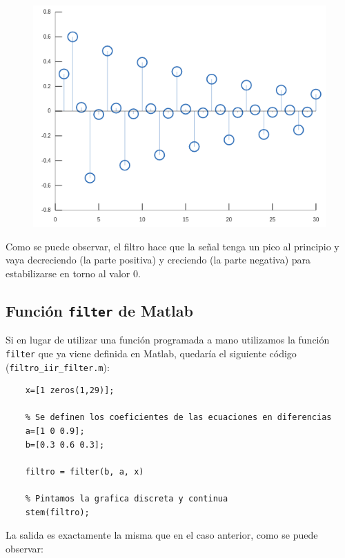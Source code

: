 \documentclass[11pt,a4paper]{article}
\begin{document}
\begin{figure}[H]
	\centering
	\includegraphics[scale=0.5]{img/stem1.png}
\end{figure}

Como se puede observar, el filtro hace que la señal tenga un pico al principio y vaya decreciendo (la parte positiva) y creciendo (la parte negativa) para estabilizarse en torno al valor 0.

\subsection{Función \texttt{filter} de Matlab}

Si en lugar de utilizar una función programada a mano utilizamos la función \texttt{filter} que ya viene definida en Matlab, quedaría el siguiente código (\texttt{filtro\_iir\_filter.m}):

\begin{lstlisting}[frame=single]
	% Se define el array con los pulsos
   	x=[1 zeros(1,29)];
   	
   	% Se definen los coeficientes de las ecuaciones en diferencias
	a=[1 0 0.9];
	b=[0.3 0.6 0.3];
	
	filtro = filter(b, a, x)
	
	% Pintamos la grafica discreta y continua
	stem(filtro);
\end{lstlisting}

La salida es exactamente la misma que en el caso anterior, como se puede observar:
\end{document}
